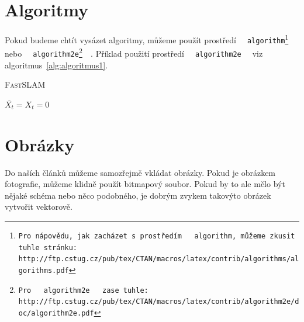 \documentclass[a4paper, 11pt]{article}
\begin{document}
\section{Algoritmy}
\label{sec:algoritmy}
Pokud budeme chtít vysázet algoritmy, můžeme použít prostředí \texttt{\,\,algorithm\footnote{Pro nápovědu, jak zacházet s prostředím \texttt{\,\,algorithm,} můžeme zkusit tuhle stránku: \\
        http://ftp.cstug.cz/pub/tex/CTAN/macros/latex/contrib/algorithms/algorithms.pdf}\,\,}
nebo \texttt{\,\,algorithm2e\footnote{Pro \texttt{\,\,algorithm2e\,\,} zase tuhle: http://ftp.cstug.cz/pub/tex/CTAN/macros/latex/contrib/algorithm2e/doc/algorithm2e.pdf}\,\,}.
Příklad použití prostředí \texttt{\,\,algorithm2e\,\,} viz algoritmus~\ref{alg:algoritmus1}.
\bigskip
\begin{algorithm}
    \label{alg:algoritmus1}
    \caption{\textsc{FastSLAM}}
    \SetNlSty{}{}{:}
    \SetNlSkip{0.4em}
    \SetInd{1em}{1em}
    \Indm\Indmm
    \Indp\Indpp
    \BlankLine

    $\overline{X_t} = X_t = 0$ \\


\end{algorithm}


\section{Obrázky}
Do naších článků můžeme samozřejmě vkládat obrázky. Pokud je obrázkem fotografie, můžeme klidně použít bitmapový soubor.
Pokud by to ale mělo být nějaké schéma nebo něco podobného, je dobrým zvykem takovýto obrázek vytvořit vektorově.
\end{document}
